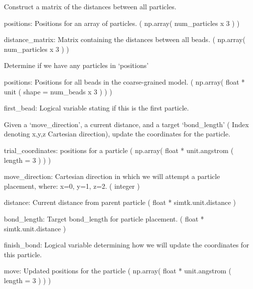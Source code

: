 \documentclass[letterpaper,12pt,english,openany,twoside]{sphinxmanual}
\begin{document}

\begin{fulllineitems}
\label{\detokenize{util:util.distance_matrix}}
Construct a matrix of the distances between all particles.

positions: Positions for an array of particles.
( np.array( num\_particles x 3 ) )

distance\_matrix: Matrix containing the distances between all beads.
( np.array( num\_particles x 3 ) )

\end{fulllineitems}


\begin{fulllineitems}
\label{\detokenize{util:util.first_bead}}
Determine if we have any particles in ‘positions’

positions: Positions for all beads in the coarse-grained model.
( np.array( float * unit ( shape = num\_beads x 3 ) ) )

first\_bead: Logical variable stating if this is the first particle.

\end{fulllineitems}


\begin{fulllineitems}
\label{\detokenize{util:util.get_move}}
Given a ‘move\_direction’, a current distance, and a
target ‘bond\_length’ ( Index denoting x,y,z Cartesian 
direction), update the coordinates for the particle.

trial\_coordinates: positions for a particle
( np.array( float * unit.angstrom ( length = 3 ) ) )

move\_direction: Cartesian direction in which we will
attempt a particle placement, where: x=0, y=1, z=2. 
( integer )

distance: Current distance from parent particle
( float * simtk.unit.distance )

bond\_length: Target bond\_length for particle placement.
( float * simtk.unit.distance )

finish\_bond: Logical variable determining how we will
update the coordinates for this particle.

move: Updated positions for the particle
( np.array( float * unit.angstrom ( length = 3 ) ) )

\end{fulllineitems}
\end{document}
